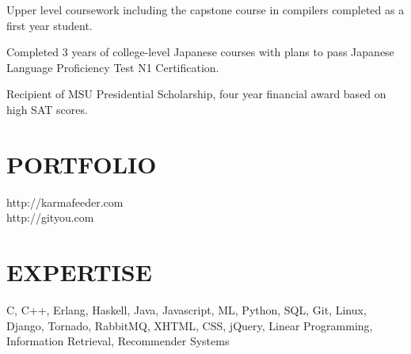 \documentclass[margin,11pt]{res} %
\begin{document}
\begin{resume}
    Upper level coursework including the capstone course in compilers completed as a first year student.
    
    Completed 3 years of college-level Japanese courses with plans to pass Japanese Language Proficiency Test N1 Certification.
    
    Recipient of MSU Presidential Scholarship, four year financial award based on high SAT scores.
 
\section{PORTFOLIO} http://karmafeeder.com \\
                    http://gityou.com

\section{EXPERTISE} C, C++, Erlang, Haskell, Java, Javascript, ML, Python, SQL, Git, Linux, Django, Tornado, RabbitMQ, XHTML, CSS, jQuery, Linear Programming, Information Retrieval, Recommender Systems

\end{resume} 
\end{document}
